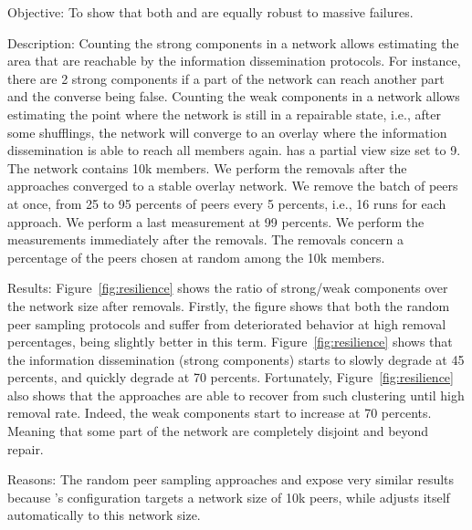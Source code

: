 % 

\begin{asparadesc}
\item[Objective:] To show that both \SPRAY and \CYCLON are equally robust to
  massive failures.
\item[Description:] Counting the strong components in a network allows
  estimating the area that are reachable by the information dissemination
  protocols. For instance, there are 2 strong components if a part of the
  network can reach another part and the converse being false.  Counting the
  weak components in a network allows estimating the point where the network is
  still in a repairable state, i.e., after some shufflings, the network will
  converge to an overlay where the information dissemination is able to reach
  all members again. \CYCLON has a partial view size set to 9. The network
  contains 10k members. We perform the removals after the approaches converged
  to a stable overlay network. We remove the batch of peers at once, from 25 to
  95 percents of peers every 5 percents, i.e., 16 runs for each approach. We
  perform a last measurement at 99 percents. We perform the measurements
  immediately after the removals. The removals concern a percentage of the
  peers chosen at random among the 10k members.
\item[Results:] Figure~\ref{fig:resilience} shows the ratio of strong/weak
  components over the network size after removals. Firstly, the figure shows
  that both the random peer sampling protocols \SPRAY and \CYCLON suffer from
  deteriorated behavior at high removal percentages, \CYCLON being slightly
  better in this term. Figure~\ref{fig:resilience} shows that the information
  dissemination (strong components) starts to slowly degrade at 45 percents,
  and quickly degrade at 70 percents. Fortunately, Figure~\ref{fig:resilience}
  also shows that the approaches are able to recover from such clustering until
  high removal rate. Indeed, the weak components start to increase at 70
  percents. Meaning that some part of the network are completely disjoint and
  beyond repair.
\item[Reasons:] The random peer sampling approaches \CYCLON and \SPRAY expose
  very similar results because \CYCLON's configuration targets a network size
  of 10k peers, while \SPRAY adjusts itself automatically to this network size.

\end{asparadesc}

